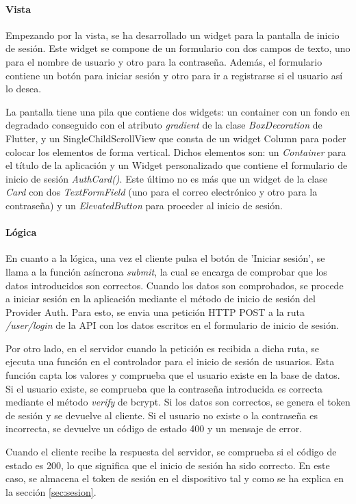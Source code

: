 \paragraph*{Vista}
Empezando por la vista, se ha desarrollado un widget para la pantalla de inicio de sesión. Este widget se compone de un formulario con dos campos de texto, uno para el nombre de usuario y otro para la contraseña. Además, el formulario contiene un botón para iniciar sesión y otro para ir a registrarse si el usuario así lo desea.

La pantalla tiene una pila que contiene dos widgets: un container con un fondo en degradado conseguido con el atributo \textit{gradient} de la clase \textit{BoxDecoration} de Flutter, y un SingleChildScrollView que consta de un widget Column para poder colocar los elementos de forma vertical. Dichos elementos son: un \textit{Container} para el título de la aplicación y un Widget personalizado que contiene el formulario de inicio de sesión \textit{AuthCard()}.
Este último no es más que un widget de la clase \textit{Card} con dos \textit{TextFormField} (uno para el correo electrónico y otro para la contraseña) y un \textit{ElevatedButton} para proceder al inicio de sesión.

\paragraph*{Lógica}
En cuanto a la lógica, una vez el cliente pulsa el botón de 'Iniciar sesión', se llama a la función asíncrona \textit{submit}, la cual se encarga de comprobar que los datos introducidos son correctos.
Cuando los datos son comprobados, se procede a iniciar sesión en la aplicación mediante el método de inicio de sesión del Provider Auth. Para esto, se envia una petición HTTP POST a la ruta \textit{/user/login} de la API con los datos escritos en el formulario de inicio de sesión.

Por otro lado, en el servidor cuando la petición es recibida a dicha ruta, se ejecuta una función en el controlador para el inicio de sesión de usuarios. Esta función capta los valores y comprueba que el usuario existe en la base de datos. Si el usuario existe, se comprueba que la contraseña introducida es correcta mediante el método \textit{verify} de bcrypt. Si los datos son correctos, se genera el token de sesión y se devuelve al cliente. Si el usuario no existe o la contraseña es incorrecta, se devuelve un código de estado 400 y un mensaje de error.

Cuando el cliente recibe la respuesta del servidor, se comprueba si el código de estado es 200, lo que significa que el inicio de sesión ha sido correcto. En este caso, se almacena el token de sesión en el dispositivo tal y como se ha explica en la sección \ref{sec:sesion}. 
\newpage
